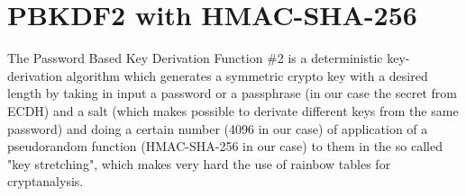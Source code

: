 \section{PBKDF2 with HMAC-SHA-256}
The Password Based Key Derivation Function \#2 is a deterministic key-derivation algorithm which generates a symmetric crypto key with a desired length by taking in input a password or a passphrase (in our case the secret from ECDH) and a salt (which makes possible to derivate different keys from the same password) and doing a certain number (4096 in our case) of application of a pseudorandom function (HMAC-SHA-256 in our case) to them in the so called "key stretching", which makes very hard the use of rainbow tables for cryptanalysis.